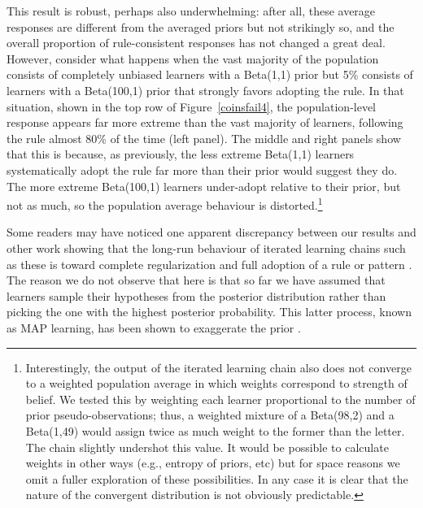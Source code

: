 \documentclass[doc]{apa6}
\begin{document}
This result is robust, perhaps also underwhelming: after all, these average responses are different from the averaged priors but not strikingly so, and the overall proportion of rule-consistent responses has not changed a great deal. However, consider what happens when the vast majority of the population consists of completely unbiased learners with a Beta(1,1) prior but 5\% consists of learners with a Beta(100,1) prior that strongly favors adopting the rule. In that situation, shown in the top row of Figure~\ref{coinsfail4}, the population-level response appears far more extreme than the vast majority of learners, following the rule almost 80\% of the time (left panel). The middle and right panels show that this is because, as previously, the less extreme Beta(1,1) learners systematically adopt the rule far more than their prior would suggest they do. The more extreme Beta(100,1) learners under-adopt relative to their prior, but not as much, so the population average behaviour is distorted.\footnote{Interestingly, the output of the iterated learning chain also does not converge to a weighted population average in which weights correspond to strength of belief. We tested this by weighting each learner proportional to the number of prior pseudo-observations; thus, a weighted mixture of a Beta(98,2) and a Beta(1,49) would assign twice as much weight to the former than the letter. The chain slightly undershot this value. It would be possible to calculate weights in other ways (e.g., entropy of priors, etc) but for space reasons we omit a fuller exploration of these possibilities. In any case it is clear that the nature of the convergent distribution is not obviously predictable.}

Some readers may have noticed one apparent discrepancy between our results and other work showing that the long-run behaviour of iterated learning chains such as these is toward complete regularization and full adoption of a rule or pattern \parencite{realigriffiths09,smithwonnacott10}. The reason we do not observe that here is that so far we have assumed that learners sample their hypotheses from the posterior distribution rather than picking the one with the highest posterior probability. This latter process, known as MAP learning, has been shown to exaggerate the prior \parencite{kirbyetal07}. 
\end{document}
